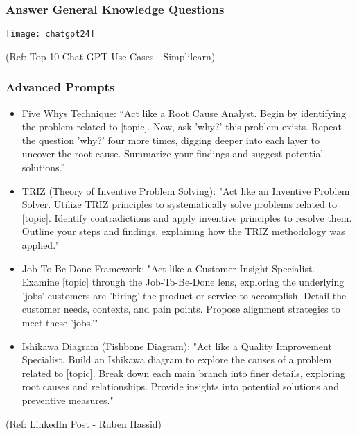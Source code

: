 \begin{frame}[fragile]\frametitle{Answer General Knowledge Questions}
\begin{center}
\texttt{[image: chatgpt24]}
\end{center}

{\tiny (Ref: Top 10 Chat GPT Use Cases - Simplilearn)}
\end{frame}


\begin{frame}[fragile]\frametitle{Advanced Prompts}
\begin{itemize}
    \item  Five Whys Technique: ``Act like a Root Cause Analyst. Begin by identifying the problem related to [topic]. Now, ask 'why?' this problem exists. Repeat the question 'why?' four more times, digging deeper into each layer to uncover the root cause. Summarize your findings and suggest potential solutions.''
	\item TRIZ (Theory of Inventive Problem Solving): "Act like an Inventive Problem Solver. Utilize TRIZ principles to systematically solve problems related to [topic]. Identify contradictions and apply inventive principles to resolve them. Outline your steps and findings, explaining how the TRIZ methodology was applied."
	\item Job-To-Be-Done Framework: "Act like a Customer Insight Specialist. Examine [topic] through the Job-To-Be-Done lens, exploring the underlying 'jobs' customers are 'hiring' the product or service to accomplish. Detail the customer needs, contexts, and pain points. Propose alignment strategies to meet these 'jobs.'"
	\item Ishikawa Diagram (Fishbone Diagram): "Act like a Quality Improvement Specialist. Build an Ishikawa diagram to explore the causes of a problem related to [topic]. Break down each main branch into finer details, exploring root causes and relationships. Provide insights into potential solutions and preventive measures."
\end{itemize}

{\tiny (Ref: LinkedIn Post - Ruben Hassid)}
\end{frame}

